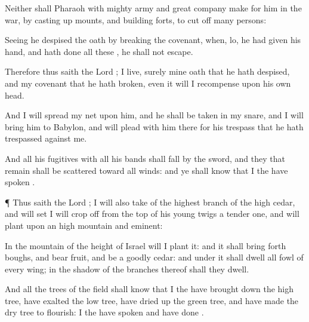 {Neither shall
Pharaoh with
{}
mighty
army and
great
company
make for him in the
war, by casting
up
mounts, and
building
forts, to cut
off
many
persons:

Seeing he
despised the
oath by
breaking the
covenant, when, lo, he had
given his
hand, and hath
done all these
{}, he shall not
escape.

Therefore thus
saith the
Lord
{};
{} I
live, surely mine
oath that he hath
despised, and my
covenant that he hath
broken, even it will I
recompense upon his own
head.

And I will
spread my
net upon him, and he shall be
taken in my
snare, and I will
bring him to
Babylon, and will
plead with him there for his
trespass that he hath
trespassed against me.

And all his
fugitives with all his
bands shall
fall by the
sword, and they that
remain shall be
scattered toward all
winds: and ye shall
know that I the
{} have
spoken
{}.


\par }{\PP {}¶ Thus
saith the
Lord
{}; I will also
take of the highest
branch of the
high
cedar, and will
set
{} I will crop
off from the
top of his young
twigs a tender
one, and will
plant
{} upon an
high
mountain and
eminent:

In the
mountain of the
height of
Israel will I
plant it: and it shall bring
forth
boughs, and
bear
fruit, and be a
goodly
cedar: and under it shall
dwell all
fowl of every
wing; in the
shadow of the
branches thereof shall they
dwell.

And all the
trees of the
field shall
know that I the
{} have brought
down the
high
tree, have
exalted the
low
tree, have
dried up the
green
tree, and have made the
dry
tree to
flourish: I the
{} have
spoken and have
done
{}.




\par }
